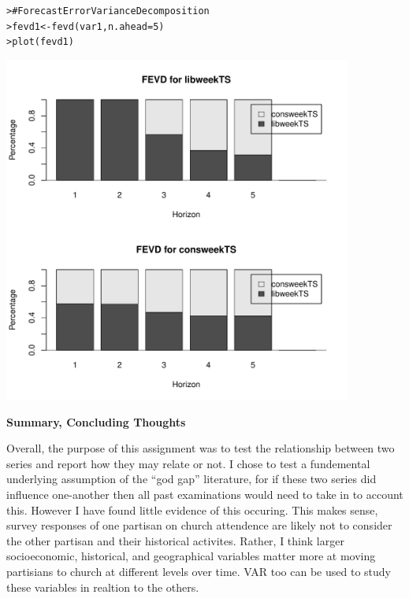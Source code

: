 \documentclass[12pt]{article}\usepackage[]{graphicx}\usepackage[]{color}
\makeatletter
\def\maxwidth{ %
  \ifdim\Gin@nat@width>\linewidth
    \linewidth
  \else
    \Gin@nat@width
  \fi
}
\newcommand{\hlnum}[1]{\textcolor[rgb]{0.82,0.78,0.62}{#1}}%
\newcommand{\hlcom}[1]{\textcolor[rgb]{0.404,0.408,0.42}{#1}}%
\newcommand{\hlstd}[1]{\textcolor[rgb]{0.882,0.878,0.898}{#1}}%
\newcommand{\hlkwb}[1]{\textcolor[rgb]{0.902,0.675,0.196}{#1}}%
\newcommand{\hlkwc}[1]{\textcolor[rgb]{0.812,0.522,0.388}{#1}}%
\newcommand{\hlkwd}[1]{\textcolor[rgb]{0.733,0.388,0.812}{#1}}%
\newenvironment{kframe}{%
 \def\at@end@of@kframe{}%
 \ifinner\ifhmode%
  \def\at@end@of@kframe{\end{minipage}}%
  \begin{minipage}{\columnwidth}%
 \fi\fi%
 \def\FrameCommand##1{\hskip\@totalleftmargin \hskip-\fboxsep
 \colorbox{shadecolor}{##1}\hskip-\fboxsep
     \hskip-\linewidth \hskip-\@totalleftmargin \hskip\columnwidth}%
 \MakeFramed {\advance\hsize-\width
   \@totalleftmargin\z@ \linewidth\hsize
   \@setminipage}}%
 {\par\unskip\endMakeFramed%
 \at@end@of@kframe}
\newenvironment{knitrout}{}{} %
\makeatother
\begin{document}
\begin{flushleft}
\begin{center}
\begin{knitrout}
\begin{kframe}\begin{alltt}
\hlstd{> }\hlcom{# Forecast Error Variance Decomposition}
\hlstd{> } \hlstd{fevd1} \hlkwb{<-} \hlkwd{fevd}\hlstd{(var1,} \hlkwc{n.ahead} \hlstd{=} \hlnum{5}\hlstd{)}
\hlstd{> } \hlkwd{plot}\hlstd{(fevd1)}
\end{alltt}
\end{kframe}
\includegraphics[width=\maxwidth,height=4.5in]{figure/inov-3} 

\end{knitrout}
\end{center}


\textbf{Summary, Concluding Thoughts}

Overall, the purpose of this assignment was to test the relationship between two series and report how they may relate or not. I chose to test a fundemental underlying assumption of the ``god gap'' literature, for if these two series did influence one-another then all past examinations would need to take in to account this. However I have found little evidence of this occuring. This makes sense, survey responses of one partisan on church attendence are likely not to consider the other partisan and their historical activites. Rather, I think larger socioeconomic, historical, and geographical variables matter more at moving partisians to church at different levels over time. VAR too can be used to study these variables in realtion to the others.


\end{flushleft}
\end{document}

